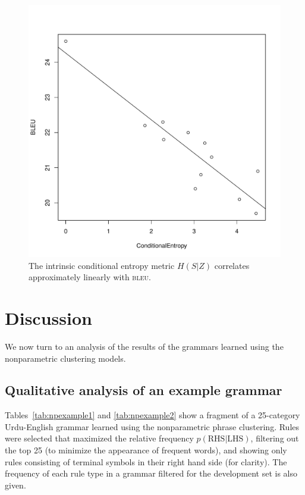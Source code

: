 \begin{figure}
\begin{center}
\includegraphics[scale=0.5]{pyp_clustering/correl.pdf}
\vspace{-0.3cm}
\end{center}
\caption{The intrinsic conditional entropy metric $H(S|Z)$ correlates approximately linearly with \textsc{bleu}.}
\label{fig:intr_correl}
\end{figure}


\section{Discussion}

We now turn to an analysis of the results of the grammars learned using the nonparametric clustering models.

\subsection{Qualitative analysis of an example grammar}

Tables~\ref{tab:npexample1} and \ref{tab:npexample2} show a fragment of a 25-category Urdu-English grammar learned using the nonparametric phrase clustering.  Rules were selected that maximized the relative frequency $p(\textrm{RHS}|\textrm{LHS})$, filtering out the top 25 (to minimize the appearance of frequent words), and showing only rules consisting of terminal symbols in their right hand side (for clarity). The frequency of each rule type in a grammar filtered for the development set is also given.

